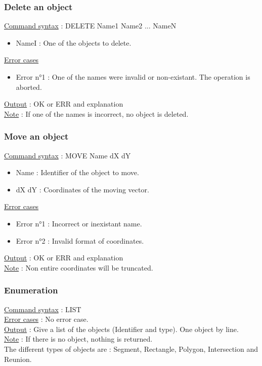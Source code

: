 \documentclass[a4paper, 12pts]{article}
\begin{document}
		\subsubsection{Delete an object}
			\uline{Command syntax} :
			DELETE Name1 Name2 ... NameN
			\begin{itemize}
				\item NameI : One of the objects to delete.
			\end{itemize}
			\uline{Error cases}
			\begin{itemize}
				\item Error n°1 : One of the names were invalid or non-existant. The operation is aborted.
			\end{itemize}
			\uline{Output} : OK or ERR and explanation\\
			\uline{Note} : 
			If one of the names is incorrect, no object is deleted.

		\subsubsection{Move an object}
			\uline{Command syntax} :
			MOVE Name dX dY
			\begin{itemize}
				\item Name : Identifier of the object to move.
				\item dX dY : Coordinates of the moving vector.
			\end{itemize}
			\uline{Error cases}
			\begin{itemize}
				\item Error n°1 : Incorrect or inexistant name.
				\item Error n°2 : Invalid format of coordinates.
			\end{itemize}
			\uline{Output} : OK or ERR and explanation\\
			\uline{Note} : 
			Non entire coordinates will be truncated.

		\subsubsection{Enumeration}
			\uline{Command syntax} :
			LIST\\
			\uline{Error cases} : No error case.\\
			\uline{Output} : Give a list of the objects (Identifier and type). One object by line.\\
			\uline{Note} : 
			If there is no object, nothing is returned.\\
			The different types of objects are : Segment, Rectangle, Polygon, Intersection and Reunion.
\end{document}
